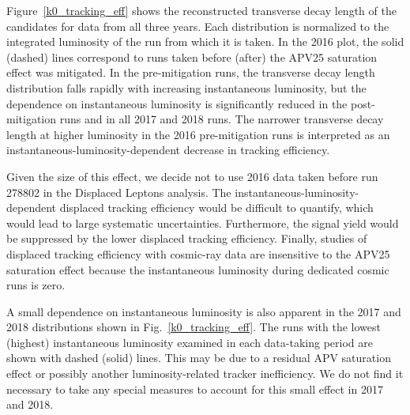 Figure~\ref{k0_tracking_eff} shows the reconstructed transverse decay length of the \Kzero candidates for data from all three years. Each distribution is normalized to the integrated luminosity of the run from which it is taken. In the 2016 plot, the solid (dashed) lines correspond to runs taken before (after) the APV25 saturation effect was mitigated. In the pre-mitigation runs, the \Kzero transverse decay length distribution falls rapidly with increasing instantaneous luminosity, but the dependence on instantaneous luminosity is significantly reduced in the post-mitigation runs and in all 2017 and 2018 runs. The narrower transverse decay length at higher luminosity in the 2016 pre-mitigation runs is interpreted as an instantaneous-luminosity-dependent decrease in tracking efficiency.



Given the size of this effect, we decide not to use 2016 data taken before run 278802 in the Displaced Leptons analysis. The instantaneous-luminosity-dependent displaced tracking efficiency would be difficult to quantify, which would lead to large systematic uncertainties. Furthermore, the signal yield would be suppressed by the lower displaced tracking efficiency. Finally, studies of displaced tracking efficiency with cosmic-ray data are insensitive to the APV25 saturation effect because the instantaneous luminosity during dedicated cosmic runs is zero.

A small dependence on instantaneous luminosity is also apparent in the 2017 and 2018 distributions shown in Fig.~\ref{k0_tracking_eff}. The runs with the lowest (highest) instantaneous luminosity examined in each data-taking period are shown with dashed (solid) lines. This may be due to a residual APV saturation effect or possibly another luminosity-related tracker inefficiency. We do not find it necessary to take any special measures to account for this small effect in 2017 and 2018.


